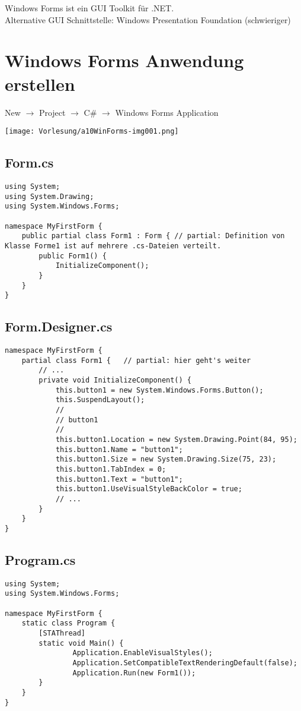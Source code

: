 Windows Forms ist ein GUI Toolkit für .NET.\\
Alternative GUI Schnittstelle: Windows Presentation Foundation (schwieriger)

\section{Windows Forms Anwendung erstellen}

New $\to$ Project $\to$ C\# $\to$ Windows Forms Application
\begin{center}
\texttt{[image: Vorlesung/a10WinForms-img001.png]} 
\end{center}

\subsection{Form.cs}
\begin{lstlisting}[language={[Sharp]C}]
using System;
using System.Drawing;
using System.Windows.Forms;

namespace MyFirstForm {
	public partial class Form1 : Form {	// partial: Definition von Klasse Forme1 ist auf mehrere .cs-Dateien verteilt.
		public Form1() {
			InitializeComponent();
		}
	}
}
\end{lstlisting}

\subsection{Form.Designer.cs}
\begin{lstlisting}[language={[Sharp]C}]
namespace MyFirstForm {
	partial class Form1 {	// partial: hier geht's weiter
		// ...
		private void InitializeComponent() {
			this.button1 = new System.Windows.Forms.Button();
			this.SuspendLayout();
			// 
			// button1
			// 
			this.button1.Location = new System.Drawing.Point(84, 95);
			this.button1.Name = "button1";
			this.button1.Size = new System.Drawing.Size(75, 23);
			this.button1.TabIndex = 0;
			this.button1.Text = "button1";
			this.button1.UseVisualStyleBackColor = true;
			// ...
		}
	}
}
\end{lstlisting}

\subsection{Program.cs}
\begin{lstlisting}[language={[Sharp]C}]
using System;
using System.Windows.Forms;

namespace MyFirstForm {
	static class Program {
		[STAThread]
		static void Main() {
				Application.EnableVisualStyles();
				Application.SetCompatibleTextRenderingDefault(false);
				Application.Run(new Form1());
		}
	}
}
\end{lstlisting}

